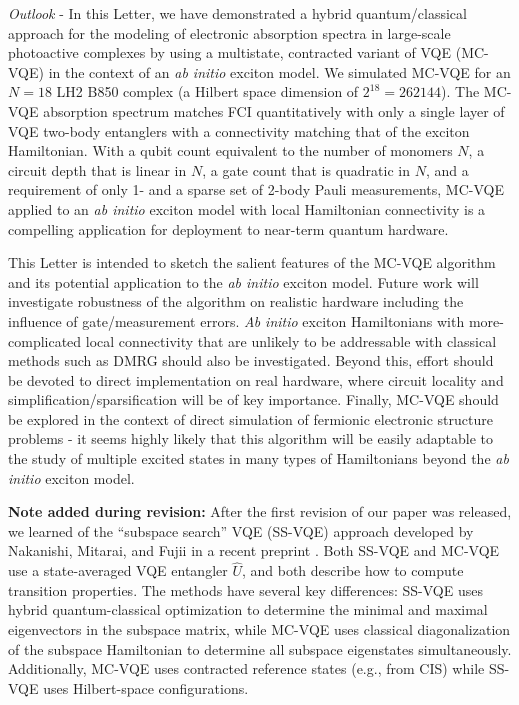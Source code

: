 \documentclass[aps,prl,twocolumn,showpacs,superscriptaddress,groupedaddress]{revtex4}  %
\begin{document}
\textit{Outlook } - In this Letter, we have demonstrated a hybrid
quantum/classical approach for the modeling of electronic absorption spectra in
large-scale photoactive complexes by using a multistate, contracted variant of
VQE (MC-VQE) in the context of an \emph{ab initio} exciton model.  We simulated
MC-VQE for an $N=18$ LH2 B850 complex (a Hilbert space
dimension of $2^{18}=262144$).
The MC-VQE
absorption spectrum matches FCI quantitatively with only a single layer of VQE
two-body entanglers with a connectivity matching that of the exciton
Hamiltonian. With a qubit count equivalent to the number of monomers $N$, a
circuit depth that is linear in $N$, a gate count that is quadratic in $N$, and
a requirement of only 1- and a sparse set of 2-body Pauli measurements, MC-VQE
applied to an \emph{ab initio} exciton model with local Hamiltonian connectivity is a
compelling application for deployment to near-term quantum hardware.

This Letter is intended to sketch the salient features of the MC-VQE algorithm
and its potential application to the \emph{ab initio} exciton model. Future work
will investigate robustness of the algorithm on realistic hardware including the
influence of gate/measurement errors. \emph{Ab initio} exciton Hamiltonians with
more-complicated local connectivity that are unlikely to be addressable with
classical methods such as DMRG should also be investigated.  Beyond this, effort
should be devoted to direct implementation on real hardware, where circuit
locality and simplification/sparsification will be of key importance. Finally,
MC-VQE should be explored in the context of direct simulation of fermionic
electronic structure problems - it seems highly likely that this algorithm will
be easily adaptable to the study of multiple excited states in many types of
Hamiltonians beyond the \emph{ab initio} exciton model.

\textbf{Note added during revision:} After the first revision of our paper was
released, we learned of the ``subspace search'' VQE (SS-VQE) approach developed
by Nakanishi, Mitarai, and Fujii in a recent preprint \cite{Nakanishi:2018:X}.
Both SS-VQE and MC-VQE use a state-averaged VQE entangler $\hat U$, and both
describe how to compute transition properties. The methods have several key
differences: SS-VQE uses hybrid quantum-classical optimization to determine the
minimal and maximal eigenvectors in the subspace matrix, while MC-VQE uses
classical diagonalization of the subspace Hamiltonian to determine all subspace
eigenstates simultaneously. Additionally, MC-VQE uses contracted reference
states (e.g., from CIS) while SS-VQE uses Hilbert-space configurations.
\end{document}
